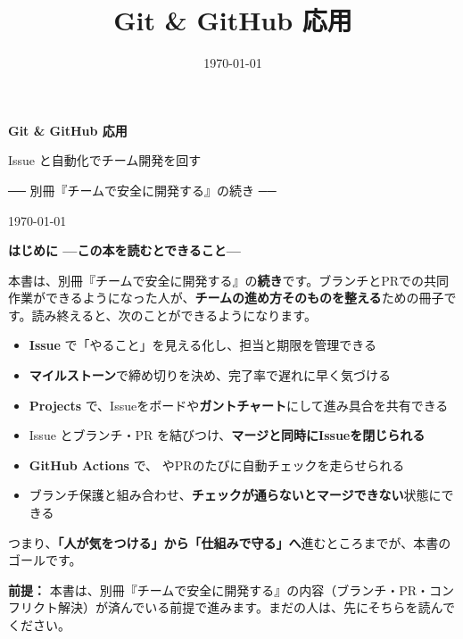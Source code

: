 \documentclass[book, paper=a4, fontsize=10.5pt, titlepage]{jlreq}
\title{Git \& GitHub 応用}
\author{}
\date{\today}
\begin{document}
\begin{titlepage}
  \centering
  \vspace*{4cm}
  {\sffamily\bfseries\Huge Git \& GitHub 応用\par}
  \vspace{1.2cm}
  {\sffamily\Large Issue と自動化でチーム開発を回す\par}
  \vspace{0.6cm}
  {\sffamily\normalsize ── 別冊『チームで安全に開発する』の続き ──\par}
  \vfill
  {\large \today\par}
\end{titlepage}

\thispagestyle{empty}
\vspace*{1.5cm}
{\sffamily\LARGE\bfseries はじめに —この本を読むとできること—\par}
\vspace{1em}

本書は、別冊『チームで安全に開発する』の\textbf{続き}です。ブランチとPRでの共同作業ができるようになった人が、\textbf{チームの進め方そのものを整える}ための冊子です。読み終えると、次のことができるようになります。

\begin{itemize}[leftmargin=1.6em]
  \item \textbf{Issue} で「やること」を見える化し、担当と期限を管理できる
  \item \textbf{マイルストーン}で締め切りを決め、完了率で遅れに早く気づける
  \item \textbf{Projects} で、Issueをボードや\textbf{ガントチャート}にして進み具合を共有できる
  \item Issue とブランチ・PR を結びつけ、\textbf{マージと同時にIssueを閉じられる}
  \item \textbf{GitHub Actions} で、 やPRのたびに自動チェックを走らせられる
  \item ブランチ保護と組み合わせ、\textbf{チェックが通らないとマージできない}状態にできる
\end{itemize}

つまり、\textbf{「人が気をつける」から「仕組みで守る」へ}進むところまでが、本書のゴールです。

\begin{warnbox}
\textbf{前提：} 本書は、別冊『チームで安全に開発する』の内容（ブランチ・PR・コンフリクト解決）が済んでいる前提で進みます。まだの人は、先にそちらを読んでください。
\end{warnbox}
\end{document}
